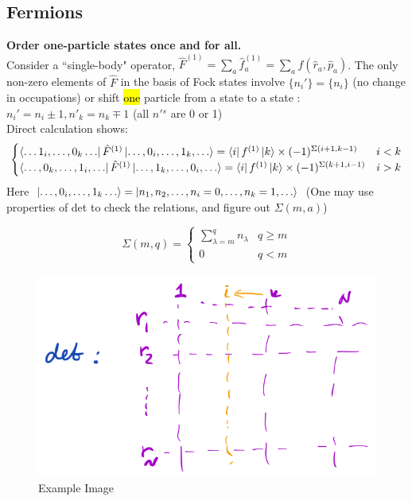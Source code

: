 \documentclass[10pt]{article}
\newcommand*\circled[1]{\tikz[baseline=(char.base)]{
            \node[shape=circle,draw,inner sep=2pt] (char) {#1};}}
\newcommand{\onebody}[1]{{#1}^{(1)}}
\begin{document}
\subsection{Fermions}
\textbf{Order one-particle states once and for all.} \\
Consider a ``single-body" operator, $\hat F^{(1)} = \sum_a \hat f_a^{(1)} = \sum_a f(\hat r_a, \hat p_a)$. The only non-zero elements of $\hat F$ in the basis of Fock states involve $\{n_i'\} = \{n_i\}$ (no change in occupations) or shift \hl{one} particle from a state \circled{i} to a state \circled{k}: $n_i' = n_i \pm 1, n'_k = n_k \mp 1$ (all $n'{}^s$ are 0 or 1)\\
\noindent Direct calculation shows:
\[
\begin{cases}
    \bra{\dots 1_i,\dots,0_k\dots}\onebody{\hat F}\ket{\dots,0_i,\dots,1_k,\dots} = \bra{i}\onebody{f}\ket{k} \times (-1)^{\Sigma(i+1, k-1)} & i<k \\
    \bra{\dots, 0_k,\dots ,1_i, \dots}\onebody{\hat F} \ket{\dots, 1_k, \dots, 0_i,\dots} = \bra{i} \onebody{f}\ket{k} \times (-1)^{\Sigma(k+1, i-1)} & i > k
\end{cases}
\]
Here $\ket{\dots, 0_i, \dots, 1_k \dots} = \ket{n_1, n_2, \dots, n_i = 0, \dots, n_k=1,\dots}$ (One may use properties of det to check the relations, and figure out $\Sigma(m,a)$)\\
\begin{figure}[htbp]
  \centering
  \begin{minipage}{0.45\textwidth}
    \[
        \Sigma(m, q) = 
        \begin{cases}
            \sum_{\lambda = m}^q n_\lambda & q \geq m\\
            0 & q < m
        \end{cases}
    \]
  \end{minipage}
  \hfill
  \begin{minipage}{0.45\textwidth}
    \centering
    \includegraphics[width=\textwidth]{./figures/determinant2.png}
    \caption{Example Image}
    \label{fig:example}
  \end{minipage}
\end{figure}
\end{document}
